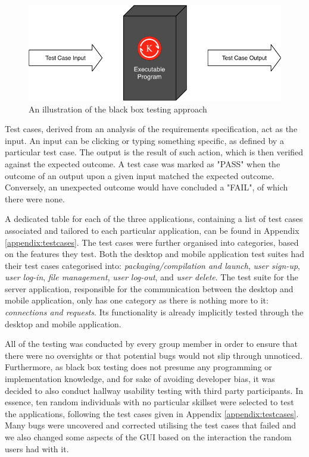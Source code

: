 \documentclass[11pt]{article}
\begin{document}
\begin{figure}[H]
	\centering
	\includegraphics[scale=1.0]{graphics/black-box.pdf}
	\caption{An illustration of the black box testing approach}
	\label{fig:black-box}
\end{figure}

Test cases, derived from an analysis of the requirements specification, act as the input. An input can be clicking or typing something specific, as defined by a particular test case. The output is the result of such action, which is then verified against the expected outcome. A test case was marked as "PASS" when the outcome of an output upon a given input matched the expected outcome. Conversely, an unexpected outcome would have concluded a "FAIL", of which there were none.

A dedicated table for each of the three applications, containing a list of test cases associated and tailored to each particular application, can be found in Appendix \ref{appendix:testcases}. The test cases were further organised into categories, based on the features they test. Both the desktop and mobile application test suites had their test cases categorised into: \emph{packaging/compilation and launch}, \emph{user sign-up}, \emph{user log-in}, \emph{file management}, \emph{user log-out}, and \emph{user delete}. The test suite for the server application, responsible for the communication between the desktop and mobile application, only has one category as there is nothing more to it: \emph{connections and requests}. Its functionality is already implicitly tested through the desktop and mobile application.

All of the testing was conducted by every group member in order to ensure that there were no oversights or that potential bugs would not slip through unnoticed. Furthermore, as black box testing does not presume any programming or implementation knowledge, and for sake of avoiding developer bias, it was decided to also conduct hallway usability testing \cite{hallwayusabilitytesting:19} with third party participants. In essence, ten random individuals with no particular skillset were selected to test the applications, following the test cases given in Appendix \ref{appendix:testcases}. Many bugs were uncovered and corrected utilising the test cases that failed and we also changed some aspects of the GUI based on the interaction the random users had with it.
\end{document}
